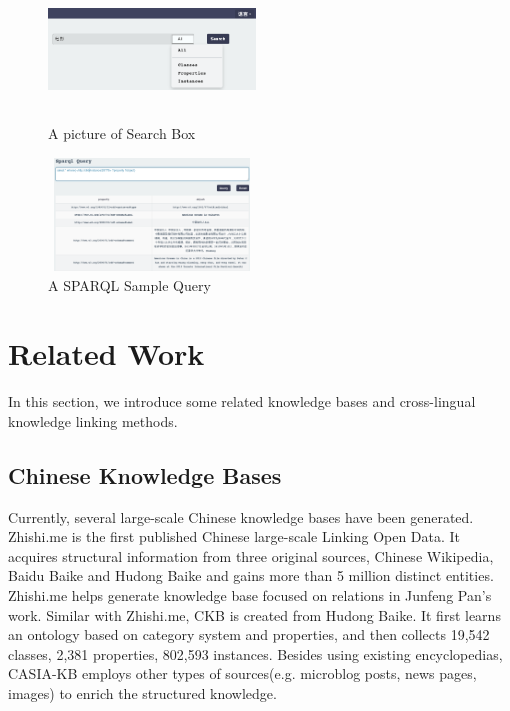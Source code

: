 \documentclass[runningheads,a4paper]{llncs}
\begin{document}
\begin{figure}
    \begin{minipage}[t]{0.5\textwidth}
        \centerline{\includegraphics[width=5.5cm,height=3cm]{fig/search-engine}}
        \caption{A picture of Search Box}
        \label{fig:search-engine}
    \end{minipage}%
    \begin{minipage}[t]{0.5\textwidth}
        \centerline{\includegraphics[width=5.5cm,height=3cm]{fig/sparql-endpoint}}
        \caption{A SPARQL Sample Query}
        \label{fig:sparql-endpoint}
    \end{minipage}%
\end{figure}

\section{Related Work}
\label{sec:work}
In this section, we introduce some related knowledge bases and cross-lingual knowledge linking methods.
\subsection{Chinese Knowledge Bases}
Currently, several large-scale Chinese knowledge bases have been generated. Zhishi.me\cite{niu2011zhishi,wang2014publishing} is the first published Chinese large-scale Linking Open Data. It acquires structural information from three original sources, Chinese Wikipedia, Baidu Baike and Hudong Baike and gains more than 5 million distinct entities. Zhishi.me helps generate knowledge base focused on relations in Junfeng Pan’s work\cite{pan2012building}.
Similar with Zhishi.me, CKB\cite{wang2012building} is created from Hudong Baike. It first learns an ontology based on category system and properties, and then collects 19,542 classes, 2,381 properties, 802,593 instances. Besides using existing encyclopedias, CASIA-KB employs other types of sources(e.g. microblog posts, news pages, images) to enrich the structured knowledge.
\end{document}
